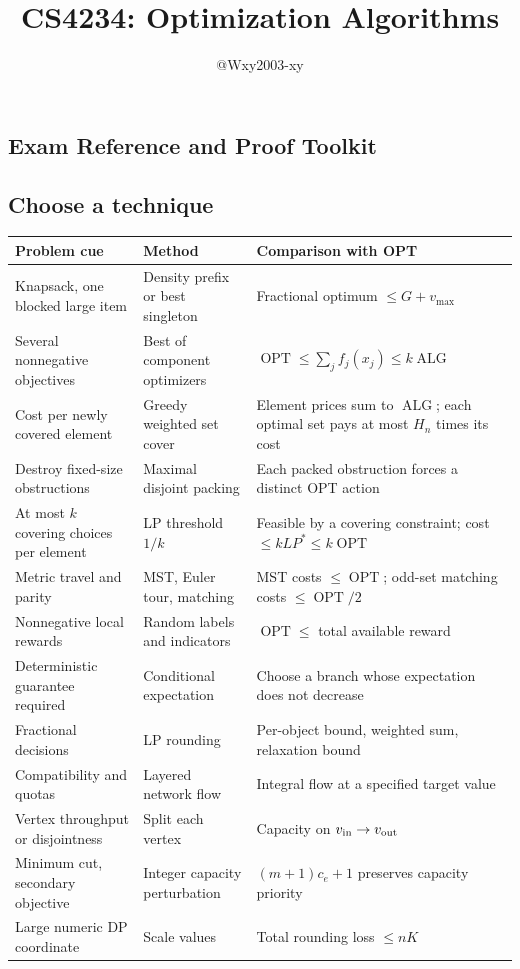 \documentclass[8pt]{extarticle}
\title{CS4234: Optimization Algorithms}
\author{@Wxy2003-xy}
\date{}
\theoremstyle{definition}
\newcommand{\OPT}{\operatorname{OPT}}
\newcommand{\ALG}{\operatorname{ALG}}
\begin{document}
\maketitle
\begin{multicols}{2}
\tableofcontents
\end{multicols}
\clearpage
\begin{multicols*}{2}

\section{Exam Reference and Proof Toolkit}
\label{ref:toolkit}
\subsection{Choose a technique}
\begin{center}
\small
\setlength{\tabcolsep}{3pt}
\begin{tabularx}{\linewidth}{@{}Y{0.85}Y{0.95}Y{1.20}@{}}
\toprule
\textbf{Problem cue} & \textbf{Method} & \textbf{Comparison with OPT}\\
\midrule
Knapsack, one blocked large item & Density prefix or best singleton & Fractional optimum $\le G+v_{\max}$\\
Several nonnegative objectives & Best of component optimizers & $\OPT\le\sum_j f_j(x_j)\le k\ALG$\\
Cost per newly covered element & Greedy weighted set cover & Element prices sum to $\ALG$; each optimal set pays at most $H_n$ times its cost\\
Destroy fixed-size obstructions & Maximal disjoint packing & Each packed obstruction forces a distinct OPT action\\
At most $k$ covering choices per element & LP threshold $1/k$ & Feasible by a covering constraint; cost $\le kLP^*\le k\OPT$\\
Metric travel and parity & MST, Euler tour, matching & MST costs $\le\OPT$; odd-set matching costs $\le\OPT/2$\\
Nonnegative local rewards & Random labels and indicators & $\OPT\le$ total available reward\\
Deterministic guarantee required & Conditional expectation & Choose a branch whose expectation does not decrease\\
Fractional decisions & LP rounding & Per-object bound, weighted sum, relaxation bound\\
Compatibility and quotas & Layered network flow & Integral flow at a specified target value\\
Vertex throughput or disjointness & Split each vertex & Capacity on $v_{\rm in}\to v_{\rm out}$\\
Minimum cut, secondary objective & Integer capacity perturbation & $(m+1)c_e+1$ preserves capacity priority\\
Large numeric DP coordinate & Scale values & Total rounding loss $\le nK$\\
\bottomrule
\end{tabularx}
\end{center}


\end{multicols*}
\end{document}
